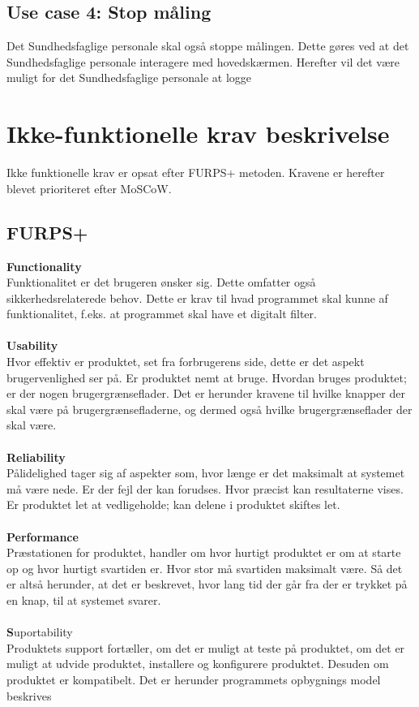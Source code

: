 \subsection{Use case 4: Stop måling}
Det Sundhedsfaglige personale skal også stoppe målingen. Dette gøres ved at det Sundhedsfaglige personale interagere med hovedskærmen. Herefter vil det være muligt for det Sundhedsfaglige personale at logge 
\section{Ikke-funktionelle krav beskrivelse}
Ikke funktionelle krav er opsat efter FURPS+ metoden. Kravene er herefter blevet prioriteret efter MoSCoW.
\subsection{FURPS+}
\textbf{Functionality}\\
Funktionalitet er det brugeren ønsker sig. Dette omfatter også sikkerhedsrelaterede behov. Dette er krav til hvad programmet skal kunne af funktionalitet, f.eks. at programmet skal have et digitalt filter.\\\\
\textbf{Usability}\\
Hvor effektiv er produktet, set fra forbrugerens side, dette er det aspekt brugervenlighed ser på. Er produktet nemt at bruge. Hvordan bruges produktet; er der nogen brugergrænseflader. Det er herunder kravene til hvilke knapper der skal være på brugergrænsefladerne, og dermed også hvilke brugergrænseflader der skal være.\\\\
\textbf{Reliability}\\
Pålidelighed tager sig af aspekter som, hvor længe er det maksimalt at systemet må være nede. Er der fejl der kan forudses. Hvor præcist kan resultaterne vises. Er produktet let at vedligeholde; kan delene i produktet skiftes let.\\\\
\textbf{Performance}\\
Præstationen for produktet, handler om hvor hurtigt produktet er om at starte op og hvor hurtigt svartiden er. Hvor stor må svartiden maksimalt være. Så det er altså herunder, at det er beskrevet, hvor lang tid der går fra der er trykket på en knap, til at systemet svarer. \\\\
\textbf{S}uportability\\
Produktets support fortæller, om det er muligt at teste på produktet, om det er muligt at udvide produktet, installere og konfigurere produktet. Desuden om produktet er kompatibelt. Det er herunder programmets opbygnings model beskrives\\\\
